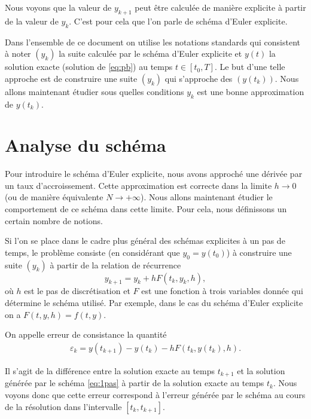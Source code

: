 \documentclass[12pt,a4paper,twoside]{article}
\begin{document}
Nous voyons que la valeur de $y_{k+1}$ peut \^etre calcul\'ee de mani\`ere explicite 
\`a partir de la valeur de $y_k$. C'est pour cela que l'on parle de sch\'ema
d'Euler explicite.


Dans l'ensemble de ce document on utilise les notations standards qui consistent
\`a noter $(y_k)$ la suite calcul\'ee par le sch\'ema d'Euler explicite
et $y(t)$ la solution exacte (solution de \eqref{eq:pb}) au temps $t \in [t_0,T]$.
Le but d'une telle approche est de construire une suite $(y_k)$ qui s'approche
des $(y(t_k))$. Nous allons maintenant \'etudier sous quelles conditions
$y_k$ est une bonne approximation de $y(t_k)$.


\section{Analyse du sch\'ema}

Pour introduire le sch\'ema d'Euler explicite, nous avons approch\'e une d\'eriv\'ee
par un taux d'accroissement. Cette approximation est correcte dans la limite
$h \to 0$ (ou de mani\`ere \'equivalente $N \to +\infty$). 
Nous allons maintenant \'etudier le comportement de ce sch\'ema dans cette limite.
Pour cela, nous d\'efinissons un certain nombre de notions.


Si l'on se place dans le cadre plus g\'en\'eral des sch\'emas explicites \`a un pas de temps,
le probl\`eme consiste (en consid\'erant que $y_0 = y(t_0)$) 
\`a construire une suite $(y_k)$ \`a partir de la relation de r\'ecurrence
\begin{equation}
  \label{eq:1pas}
  y_{k+1} = y_k + h F(t_k,y_k,h) ,
\end{equation}
o\`u $h$ est le pas de discr\'etisation et $F$ est une fonction \`a trois variables
donn\'ee qui d\'etermine le sch\'ema utilis\'e.
Par exemple, dans le cas du sch\'ema d'Euler explicite on a $F(t,y,h) = f(t,y)$.


\begin{definition}
  On appelle erreur de consistance la quantit\'e
  \begin{align*}
    \varepsilon_k = y(t_{k+1}) - y(t_k) - h F(t_k , y(t_k) , h ) .
  \end{align*}
\end{definition}
Il s'agit de la diff\'erence entre la solution exacte au temps $t_{k+1}$
et la solution g\'en\'er\'ee par le sch\'ema \eqref{eq:1pas}
\`a partir de la solution exacte au temps $t_k$.
Nous voyons donc que cette erreur correspond \`a l'erreur g\'en\'er\'ee
par le sch\'ema au cours de la r\'esolution dans l'intervalle
$[t_k , t_{k+1}]$.
\end{document}
